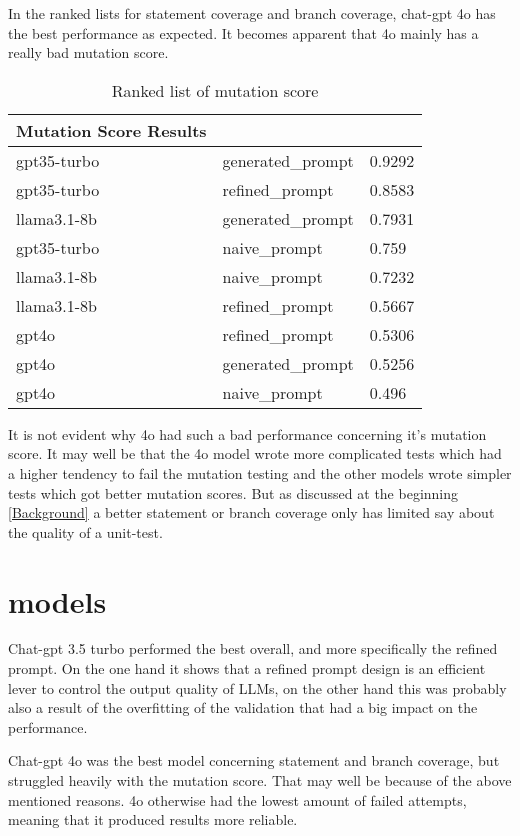 \documentclass[a4paper,11pt,oneside]{memoir}
\begin{document}
In the ranked lists for statement coverage and branch coverage, chat-gpt 4o has the best performance as expected. It becomes apparent that 4o mainly has a really bad mutation score.

\begin{table}[!ht]
    \centering
    \begin{tabular}{|l|l|l|}
    \hline
        Mutation Score Results & ~ & ~ \\ \hline
        gpt35-turbo &  generated\_prompt & 0.9292 \\ \hline
        gpt35-turbo &  refined\_prompt & 0.8583 \\ \hline
        llama3.1-8b &  generated\_prompt & 0.7931 \\ \hline
        gpt35-turbo &  naive\_prompt & 0.759 \\ \hline
        llama3.1-8b &  naive\_prompt & 0.7232 \\ \hline
        llama3.1-8b &  refined\_prompt & 0.5667 \\ \hline
        gpt4o &  refined\_prompt & 0.5306 \\ \hline
        gpt4o &  generated\_prompt & 0.5256 \\ \hline
        gpt4o &  naive\_prompt & 0.496 \\ \hline
    \end{tabular}
    \caption{Ranked list of mutation score}
\end{table}

It is not evident why 4o had such a bad performance concerning it's mutation score. It may well be that the 4o model wrote more complicated tests which had a higher tendency to fail the mutation testing and the other models wrote simpler tests which got better mutation scores. But as discussed at the beginning \ref{Background} a better statement or branch coverage only has limited say about the quality of a unit-test.

\section{models}
Chat-gpt 3.5 turbo performed the best overall, and more specifically the refined prompt. On the one hand it shows that a refined prompt design is an efficient lever to control the output quality of LLMs, on the other hand this was probably also a result of the overfitting of the validation that had a big impact on the performance.

Chat-gpt 4o was the best model concerning statement and branch coverage, but struggled heavily with the mutation score. That may well be because of the above mentioned reasons. 4o otherwise had the lowest amount of failed attempts, meaning that it produced results more reliable.
\end{document}
